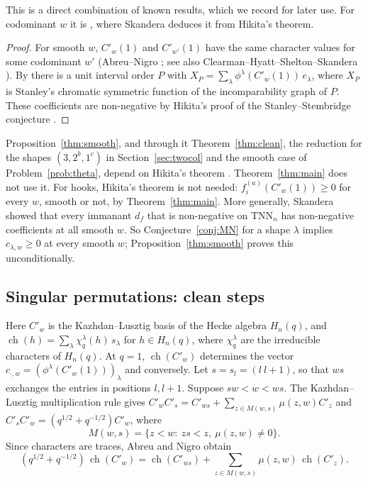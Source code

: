 \documentclass[11pt]{amsart}
\theoremstyle{definition}
\theoremstyle{remark}
\newcommand{\TNN}{\mathrm{TNN}}
\newcommand{\Cp}[1]{C'_{#1}(1)}
\DeclareMathOperator{\ch}{ch}
\begin{document}
This is a direct combination of known results, which we record for later use. For codominant $w$ it is \cite[Prop.~25]{Ska25}, where Skandera deduces it from Hikita's theorem.

\begin{proof}
For smooth $w$, $\Cp w$ and $\Cp{w'}$ have the same character values for some codominant $w'$ (Abreu--Nigro \cite[Thm.~1.6]{AN}; see also Clearman--Hyatt--Shelton--Skandera \cite[Thm.~4.6]{CHSS}). By \cite[Cor.~7.2]{CHSS} there is a unit interval order $P$ with $X_P=\sum_\lambda\phi^\lambda(\Cp w)\,e_\lambda$, where $X_P$ is Stanley's chromatic symmetric function of the incomparability graph of $P$. These coefficients are non-negative by Hikita's proof of the Stanley--Stembridge conjecture \cite{Hik}.
\end{proof}

Proposition~\ref{thm:smooth}, and through it Theorem~\ref{thm:clean}, the reduction for the shapes $(3,2^b,1^c)$ in Section~\ref{sec:twocol} and the smooth case of Problem~\ref{prob:theta}, depend on Hikita's theorem \cite{Hik}. Theorem~\ref{thm:main} does not use it. For hooks, Hikita's theorem is not needed: $f^{(a)}_i(\Cp w)\ge0$ for every $w$, smooth or not, by Theorem~\ref{thm:main}. More generally, Skandera \cite[Thm.~5.5]{Ska08} showed that every immanant $d_f$ that is non-negative on $\TNN_n$ has non-negative coefficients at all smooth $w$. So Conjecture~\ref{conj:MN} for a shape $\lambda$ implies $c_{\lambda,w}\ge0$ at every smooth $w$; Proposition~\ref{thm:smooth} proves this unconditionally.

\subsection{Singular permutations: clean steps}\label{sec:clean}
Here $C'_w$ is the Kazhdan--Lusztig basis of the Hecke algebra $H_n(q)$, and $\ch(h)=\sum_\lambda\chi^\lambda_q(h)\,s_\lambda$ for $h\in H_n(q)$, where $\chi^\lambda_q$ are the irreducible characters of $H_n(q)$. At $q=1$, $\ch(C'_w)$ determines the vector $c_{\cdot,w}=(\phi^\lambda(\Cp w))_\lambda$ and conversely. Let $s=s_l=(l\ l{+}1)$, so that $ws$ exchanges the entries in positions $l,l+1$. Suppose $sw<w<ws$. The Kazhdan--Lusztig multiplication rule gives $C'_wC'_s=C'_{ws}+\sum_{z\in M(w,s)}\mu(z,w)C'_z$ and $C'_sC'_w=(q^{1/2}+q^{-1/2})C'_w$, where
\[
M(w,s)=\{z<w:\ zs<z,\ \mu(z,w)\ne0\}.
\]
Since characters are traces, Abreu and Nigro \cite[(3a)]{AN} obtain
\begin{equation}\label{eq:AN}
(q^{1/2}+q^{-1/2})\,\ch(C'_w)=\ch(C'_{ws})+\sum_{z\in M(w,s)}\mu(z,w)\,\ch(C'_z).
\end{equation}
\end{document}
